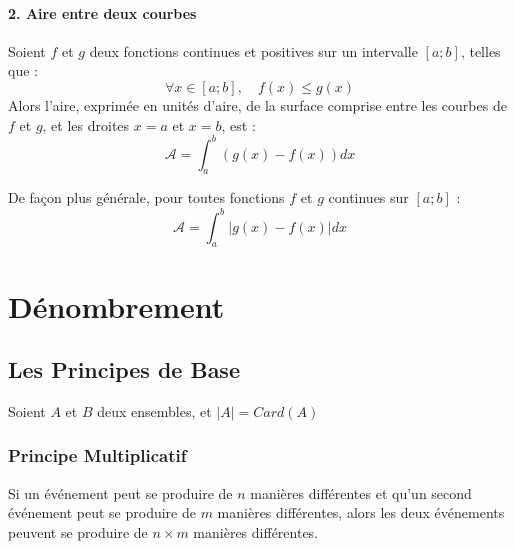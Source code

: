 \documentclass{report}
\begin{document}
      \paragraph{2. Aire entre deux courbes}
      Soient \( f \) et \( g \) deux fonctions continues et positives sur un intervalle \( [a ; b] \), telles que :
      \[
      \forall x \in [a ; b],\quad f(x) \leq g(x)
      \]
      Alors l’aire, exprimée en unités d’aire, de la surface comprise entre les courbes de \( f \) et \( g \), et les droites \( x = a \) et \( x = b \), est :
      \[
      \mathcal{A} = \int_a^b \left( g(x) - f(x) \right) dx
      \]

      De façon plus générale, pour toutes fonctions $f$ et $g$ continues sur $\left[a;b\right]$ : 
      \[
        \mathcal{A} = \int_a^b | g(x) - f(x) | dx
      \]










    \newpage



\section{Dénombrement}

\subsection{Les Principes de Base}

Soient $A$ et $B$ deux ensembles, et $|A| = Card(A)$

\iffalse\subsubsection{Principe Additif}
Si deux ensembles \( A \) et \( B \) sont disjoints, alors le nombre d'éléments dans \( A \cup B \) est égal à la somme du nombre d'éléments dans \( A \) et du nombre d'éléments dans \( B \).

\[ |A \cup B| = |A| + |B| \]\fi

\subsubsection{Principe Multiplicatif}
\label{princMul}
Si un événement peut se produire de \( n \) manières différentes et qu'un second événement peut se produire de \( m \) manières différentes, alors les deux événements peuvent se produire de \( n \times m \) manières différentes.
\end{document}
